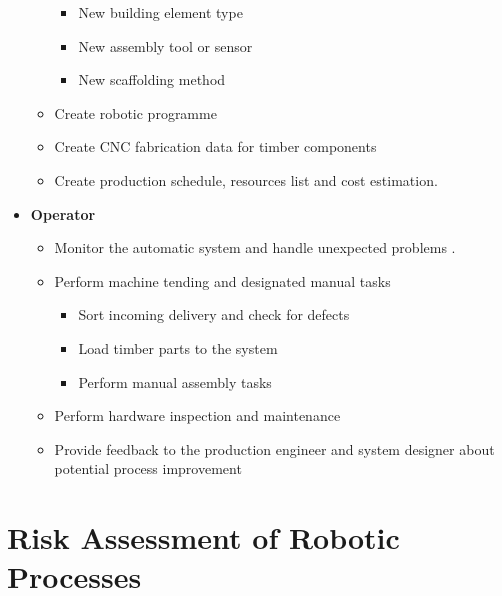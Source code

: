 \begin{itemize}
\begin{itemize}
\begin{itemize}
			\item New building element type

			\item New assembly tool or sensor

			\item New scaffolding method

		\end{itemize}
		\item Create robotic programme 
		\item Create CNC fabrication data for timber components  
		\item Create production schedule, resources list and cost estimation.
	\end{itemize}

	\item \textbf{Operator}

	\begin{itemize}
		\item Monitor the automatic system and handle unexpected problems .

		\item Perform machine tending and designated manual tasks 

		\begin{itemize}
			\item Sort incoming delivery and check for defects 
			\item Load timber parts to the system
			\item Perform manual assembly tasks 
		\end{itemize}

		\item Perform hardware inspection and maintenance

		\item Provide feedback to the production engineer and system designer about potential process improvement

	\end{itemize}
\end{itemize}

\section{Risk Assessment of Robotic Processes}
\label{section:discussion-risk-assessment-of-robotic-processes}

